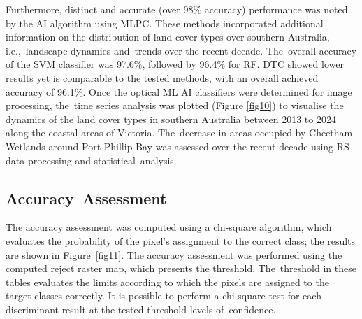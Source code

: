 \documentclass[jmse,article,accept,pdftex,oneauthor]{Definitions/mdpi}
\begin{document}
{Furthermore, }distinct and accurate (over 98\% accuracy) performance was noted by the AI algorithm using MLPC. These methods incorporated additional information on the distribution of land cover types over southern Australia, i.e.,~landscape dynamics and~trends over the recent decade. The~overall accuracy of the SVM classifier was 97.6\%, followed by 96.4\% for RF. DTC showed lower results yet is comparable to the tested methods, with an overall achieved accuracy of 96.1\%. Once the optical ML AI classifiers were determined for image processing, the~time series analysis was plotted (Figure \ref{fig10}) to visualise the dynamics of the land cover types in southern Australia between 2013 to 2024 along the coastal areas of Victoria. The~decrease in areas occupied by Cheetham Wetlands around Port Phillip Bay was assessed over the recent decade using RS data processing and statistical~analysis.




\subsection{Accuracy~Assessment}

The accuracy assessment was computed using a chi-square algorithm, which evaluates the probability of the pixel's assignment to the correct class; the results are %
shown in Figure~\ref{fig11}. The accuracy assessment was performed using the computed reject raster map, which presents the threshold. The~threshold {in these tables }evaluates the limits according to which the pixels are assigned to the target classes correctly. It is possible to perform a chi-square test for each discriminant result at the tested threshold levels of~confidence. %
\end{document}
